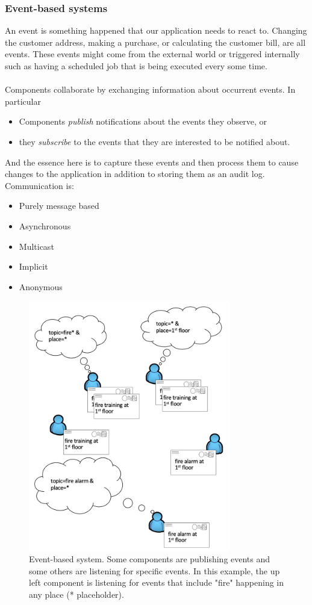 \documentclass[10pt,a4paper]{article}
\newcommand{\nline}{\\~\\}
\begin{document}
\subsubsection{Event-based systems}
An event is something happened that our application needs to react to. Changing the customer address, making a purchase, or calculating the customer bill, are all events. These events might come from the external world or triggered internally such as having a scheduled job that is being executed every some time.
\nline
Components collaborate by exchanging information about occurrent events. In particular
\begin{itemize}
	\item Components \textit{publish} notifications about the events they observe, or
	\item they \textit{subscribe} to the events that they are interested to be notified about.
\end{itemize}
And the essence here is to capture these events and then process them to cause changes to the application in addition to storing them as an audit log.
\\ \pagebreak
Communication is:
\begin{itemize}
	\item Purely message based
	\item Asynchronous
	\item Multicast
	\item Implicit
	\item Anonymous
\end{itemize}
\begin{figure}[ht!]
 \hfill \includegraphics[width=250pt]{images/event-based.png}\hspace*{\fill}
 \caption{Event-based system. Some components are publishing events and some others are listening for specific events. In this example, the up left component is listening for events that include "fire" happening in any place (* placeholder).}
\end{figure}  
\end{document}
